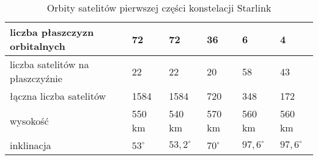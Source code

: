 \begin{table}[htbp]
\centering
\begin{tabular}{|l|l|l|l|l|l|}
\hline
liczba płaszczyzn orbitalnych & 72 & 72 & 36 & 6 & 4 \\ \hline
liczba satelitów na płaszczyźnie & 22 & 22 & 20 & 58 & 43 \\ \hline
łączna liczba satelitów & 1584 & 1584 & 720 & 348 & 172  \\ \hline
wysokość & 550 km & 540 km & 570 km & 560 km & 560 km   \\ \hline
inklinacja & $53^\circ$ & $53,2^\circ$ & $70^\circ$ & $97,6^\circ$ & $97,6^\circ$   \\ \hline
\end{tabular}
\label{tab:starlink}
\caption{Orbity satelitów pierwszej części konstelacji Starlink}
\end{table}